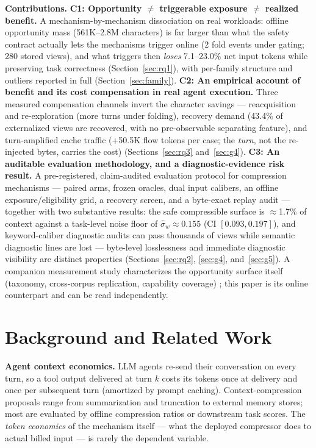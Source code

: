 \documentclass[twocolumn]{svjour3}       %
\begin{document}
\textbf{Contributions.}
\textbf{C1: Opportunity $\neq$ triggerable exposure $\neq$ realized benefit.} A
mechanism-by-mechanism dissociation on real workloads: offline opportunity mass (561K--2.8M
characters) is far larger than what the safety contract actually lets the mechanisms
trigger online (2 fold events under gating; 280 stored views), and what triggers then
\emph{loses} 7.1--23.0\% net input tokens while preserving task correctness
(Section~\ref{sec:rq1}), with per-family structure and outliers reported in full
(Section~\ref{sec:family}).
\textbf{C2: An empirical account of benefit and its cost compensation in real agent
execution.} Three measured compensation channels invert the character savings ---
reacquisition and re-exploration (more turns under folding), recovery demand (43.4\% of
externalized views are recovered, with no pre-observable separating feature), and
turn-amplified cache traffic (+50.5K flow tokens per case; the \emph{turn}, not the
re-injected bytes, carries the cost)
(Sections~\ref{sec:rq3} and~\ref{sec:g4}).
\textbf{C3: An auditable evaluation methodology, and a diagnostic-evidence risk result.}
A pre-registered, claim-audited evaluation protocol for compression mechanisms --- paired
arms, frozen oracles, dual input calibers, an offline exposure/eligibility grid, a
recovery screen, and a byte-exact replay audit --- together with two substantive results:
the safe compressible surface is $\approx$1.7\% of context against a task-level noise
floor of $\hat\sigma_w \approx 0.155$ (CI $[0.093, 0.197]$), and keyword-caliber
diagnostic audits can pass thousands of views while semantic diagnostic lines are lost
--- byte-level losslessness and immediate diagnostic visibility are distinct properties
(Sections~\ref{sec:rq2}, \ref{sec:g4}, and~\ref{sec:g5}).
A companion measurement study characterizes the opportunity surface itself
(taxonomy, cross-corpus replication, capability coverage) \cite{paperA2026}; this
paper is its online counterpart and can be read independently.

\section{Background and Related Work}
\label{sec:related}

\textbf{Agent context economics.} LLM agents re-send their conversation on every turn,
so a tool output delivered at turn $k$ costs its tokens once at delivery and once per
subsequent turn (amortized by prompt caching). Context-compression proposals range from
summarization and truncation to external memory stores; most are evaluated by offline
compression ratios or downstream task scores. The \emph{token economics} of the
mechanism itself --- what the deployed compressor does to actual billed input --- is
rarely the dependent variable.
\end{document}
